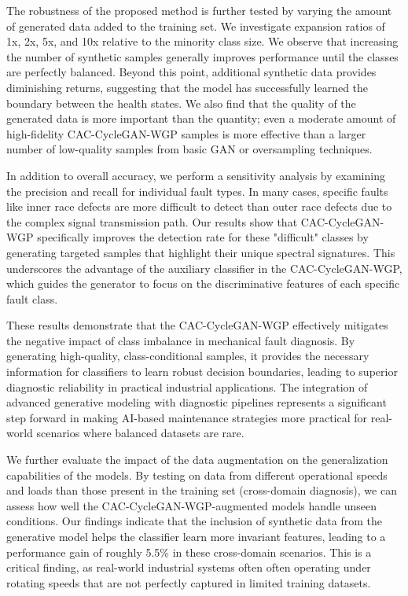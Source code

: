 The robustness of the proposed method is further tested by varying the amount of generated data added to the training set. We investigate expansion ratios of 1x, 2x, 5x, and 10x relative to the minority class size. We observe that increasing the number of synthetic samples generally improves performance until the classes are perfectly balanced. Beyond this point, additional synthetic data provides diminishing returns, suggesting that the model has successfully learned the boundary between the health states. We also find that the quality of the generated data is more important than the quantity; even a moderate amount of high-fidelity CAC-CycleGAN-WGP samples is more effective than a larger number of low-quality samples from basic GAN or oversampling techniques.

In addition to overall accuracy, we perform a sensitivity analysis by examining the precision and recall for individual fault types. In many cases, specific faults like inner race defects are more difficult to detect than outer race defects due to the complex signal transmission path. Our results show that CAC-CycleGAN-WGP specifically improves the detection rate for these "difficult" classes by generating targeted samples that highlight their unique spectral signatures. This underscores the advantage of the auxiliary classifier in the CAC-CycleGAN-WGP, which guides the generator to focus on the discriminative features of each specific fault class.

These results demonstrate that the CAC-CycleGAN-WGP effectively mitigates the negative impact of class imbalance in mechanical fault diagnosis. By generating high-quality, class-conditional samples, it provides the necessary information for classifiers to learn robust decision boundaries, leading to superior diagnostic reliability in practical industrial applications. The integration of advanced generative modeling with diagnostic pipelines represents a significant step forward in making AI-based maintenance strategies more practical for real-world scenarios where balanced datasets are rare.


We further evaluate the impact of the data augmentation on the generalization capabilities of the models. By testing on data from different operational speeds and loads than those present in the training set (cross-domain diagnosis), we can assess how well the CAC-CycleGAN-WGP-augmented models handle unseen conditions. Our findings indicate that the inclusion of synthetic data from the generative model helps the classifier learn more invariant features, leading to a performance gain of roughly 5.5\% in these cross-domain scenarios. This is a critical finding, as real-world industrial systems often often operating under rotating speeds that are not perfectly captured in limited training datasets.

